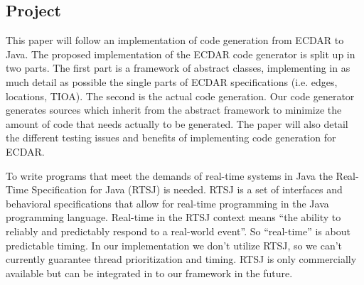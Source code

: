 \subsection{Project}
\label{introduction-problemfield}
This paper will follow an implementation of code generation from ECDAR to
Java. The proposed implementation of the ECDAR code generator is split up in two
parts. The first part is a framework of abstract classes, implementing in as
much detail as possible the single parts of ECDAR specifications (i.e. edges,
locations, TIOA). The second is the actual code generation. Our code generator
generates sources which inherit from the abstract framework to minimize the
amount of code that needs actually to be generated. The paper will also detail
the different testing issues and benefits of implementing code generation for
ECDAR.

To write programs that meet the demands of real-time systems in Java the
Real-Time Specification for Java (RTSJ) is needed. RTSJ is a set of interfaces
and behavioral specifications that allow for real-time programming in the Java
programming language.  Real-time in the RTSJ context means ``the ability to
reliably and predictably respond to a real-world event''.  So ``real-time'' is
about predictable timing. In our implementation we don't utilize RTSJ, so we
can't currently guarantee thread prioritization and timing. RTSJ is only
commercially available but can be integrated in to our framework in the future.

